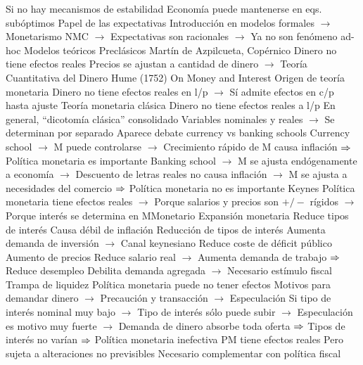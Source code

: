 \documentclass{nuevotema}
\begin{document}
\begin{esquemal}
				\4 Si no hay mecanismos de estabilidad
				\4[] Economía puede mantenerse en eqs. subóptimos
			\3 Papel de las expectativas
				\4 Introducción en modelos formales
				\4[] $\to$ Monetarismo
				\4 NMC
				\4[] $\to$ Expectativas son racionales
				\4[] $\to$ Ya no son fenómeno ad-hoc
		\2 Modelos teóricos
			\3 Preclásicos
				\4 Martín de Azpilcueta, Copérnico
				\4[] Dinero no tiene efectos reales
				\4[] Precios se ajustan a cantidad de dinero
				\4[] $\to$ Teoría Cuantitativa del Dinero
				\4 Hume (1752)
				\4[] On Money and Interest
				\4[] Origen de teoría monetaria
				\4[] Dinero no tiene efectos reales en l/p
				\4[] $\to$ Sí admite efectos en c/p hasta ajuste
			\3 Teoría monetaria clásica
				\4 Dinero no tiene efectos reales a l/p
				\4 En general, ``dicotomía clásica'' consolidado
				\4[] Variables nominales y reales
				\4[] $\to$ Se determinan por separado
				\4 Aparece debate currency vs banking schools
				\4[] Currency school
				\4[] $\to$ M puede controlarse
				\4[] $\to$ Crecimiento rápido de M causa inflación
				\4[] $\then$ Política monetaria es importante
				\4[] Banking school
				\4[] $\to$ M se ajusta endógenamente a economía
				\4[] $\to$ Descuento de letras reales no causa inflación
				\4[] $\to$ M se ajusta a necesidades del comercio
				\4[] $\then$ Política monetaria no es importante
			\3 Keynes
				\4 Política monetaria tiene efectos reales
				\4[] $\to$ Porque salarios y precios son $+/-$ rígidos
				\4[] $\to$ Porque interés se determina en MMonetario
				\4 Expansión monetaria
				\4[] Reduce tipos de interés
				\4[] Causa débil de inflación
				\4 Reducción de tipos de interés
				\4[] Aumenta demanda de inversión
				\4[] $\to$ Canal keynesiano
				\4[] Reduce coste de déficit público
				\4 Aumento de precios
				\4[] Reduce salario real
				\4[] $\to$ Aumenta demanda de trabajo
				\4[] $\then$ Reduce desempleo
				\4[] Debilita demanda agregada
				\4[] $\to$ Necesario estímulo fiscal
				\4 Trampa de liquidez
				\4[] Política monetaria puede no tener efectos
				\4[] Motivos para demandar dinero
				\4[] $\to$ Precaución y transacción
				\4[] $\to$ Especulación
				\4[] Si tipo de interés nominal muy bajo
				\4[] $\to$ Tipo de interés sólo puede subir
				\4[] $\to$ Especulación es motivo muy fuerte
				\4[] $\to$ Demanda de dinero absorbe toda oferta
				\4[] $\then$ Tipos de interés no varían
				\4[] $\then$ Política monetaria inefectiva
				\4[$\then$] PM tiene efectos reales
				\4[$\then$] Pero sujeta a alteraciones no previsibles
				\4[$\then$] Necesario complementar con política fiscal

\end{esquemal}
\end{document}
